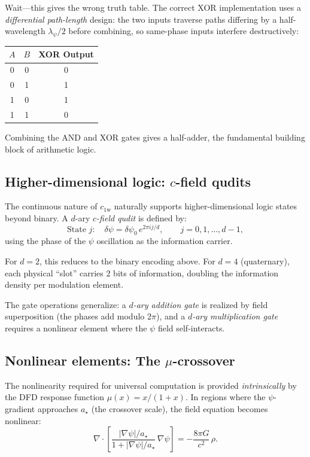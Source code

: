\documentclass[aps,prd,twocolumn,superscriptaddress,nofootinbib,floatfix]{revtex4-2}
\newcommand{\psifield}{\psi}
\newcommand{\cfield}{c_{\text{1w}}}
\newcommand{\cvac}{c}
\begin{document}
Wait---this gives the wrong truth table. The correct XOR
implementation uses a \emph{differential path-length} design:
the two inputs traverse paths differing by a half-wavelength
$\lambda_\psi/2$ before combining, so same-phase inputs interfere
destructively:

\begin{center}
\begin{tabular}{cc|c}
$A$ & $B$ & XOR Output \\
\hline
0 & 0 & 0 \\
0 & 1 & 1 \\
1 & 0 & 1 \\
1 & 1 & 0 \\
\end{tabular}
\end{center}

Combining the AND and XOR gates gives a half-adder, the
fundamental building block of arithmetic logic.

\subsection{Higher-dimensional logic: $c$-field qudits}
\label{subsec:qudits}

The continuous nature of $\cfield$ naturally supports
higher-dimensional logic states beyond binary.
A $d$-ary \emph{$c$-field qudit} is defined by:
\begin{equation}
\text{State } j: \quad \delta\psifield = \delta\psifield_0\,
e^{2\pi i j/d}, \qquad j = 0, 1, \ldots, d-1,
\label{eq:qudit}
\end{equation}
using the phase of the $\psifield$ oscillation as the information
carrier.

For $d = 2$, this reduces to the binary encoding above. For
$d = 4$ (quaternary), each physical ``slot'' carries 2 bits of
information, doubling the information density per modulation
element.

The gate operations generalize: a \emph{$d$-ary addition gate}
is realized by field superposition (the phases add modulo $2\pi$),
and a \emph{$d$-ary multiplication gate} requires a nonlinear
element where the $\psifield$ field self-interacts.

\subsection{Nonlinear elements: The $\mu$-crossover}

The nonlinearity required for universal computation is provided
\emph{intrinsically} by the DFD response function $\mu(x) = x/(1+x)$.
In regions where the $\psifield$-gradient approaches $a_\star$
(the crossover scale), the field equation becomes nonlinear:
\begin{equation}
\nabla\cdot\!\left[\frac{|\nabla\psifield|/a_\star}
{1 + |\nabla\psifield|/a_\star}\,\nabla\psifield\right]
= -\frac{8\pi G}{\cvac^2}\,\rho.
\label{eq:nonlinear_field}
\end{equation}
\end{document}
